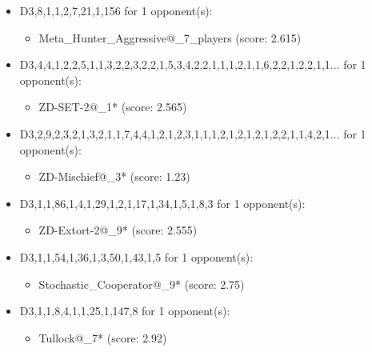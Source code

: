 \begin{appendices}
\begin{itemize}
    \item D3,8,1,1,2,7,21,1,156 for 1 opponent(s):
    \begin{multicols}{3}
         \begin{itemize}
            \item Meta\_Hunter\_Aggressive@\_7\_players (score: 2.615)
        \end{itemize}
     \end{multicols}
     
    \item D3,4,4,1,2,2,5,1,1,3,2,2,3,2,2,1,5,3,4,2,2,1,1,1,2,1,1,6,2,2,1,2,2,1,1... for 1 opponent(s):
    \begin{multicols}{3}
         \begin{itemize}
            \item ZD-SET-2@\_1* (score: 2.565)
        \end{itemize}
     \end{multicols}
     
    \item D3,2,9,2,3,2,1,3,2,1,1,7,4,4,1,2,1,2,3,1,1,1,2,1,2,1,2,1,2,2,1,1,4,2,1... for 1 opponent(s):
    \begin{multicols}{3}
         \begin{itemize}
            \item ZD-Mischief@\_3* (score: 1.23)
        \end{itemize}
     \end{multicols}
     
    \item D3,1,1,86,1,4,1,29,1,2,1,17,1,34,1,5,1,8,3 for 1 opponent(s):
    \begin{multicols}{3}
         \begin{itemize}
            \item ZD-Extort-2@\_9* (score: 2.555)
        \end{itemize}
     \end{multicols}
     
    \item D3,1,1,54,1,36,1,3,50,1,43,1,5 for 1 opponent(s):
    \begin{multicols}{3}
         \begin{itemize}
            \item Stochastic\_Cooperator@\_9* (score: 2.75)
        \end{itemize}
     \end{multicols}
     
    \item D3,1,1,8,4,1,1,25,1,147,8 for 1 opponent(s):
    \begin{multicols}{3}
         \begin{itemize}
            \item Tullock@\_7* (score: 2.92)
        \end{itemize}
     \end{multicols}
     

\end{itemize}
\end{appendices}
